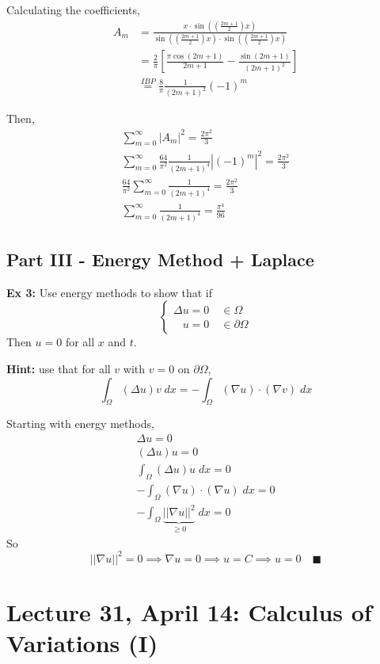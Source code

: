 \documentclass[12pt]{article}
\begin{document}
Calculating the coefficients, 
\begin{align*}
    A_m &= \frac{x \cdot \sin\left(\left(\frac{2m + 1}{2}\right)x\right)}{\sin\left(\left(\frac{2m + 1}{2}\right)x\right) \cdot \sin\left(\left(\frac{2m + 1}{2}\right)x\right)}\\
    &= \frac{2}{\pi}\left[\frac{\pi\cos(2m + 1)}{2m + 1} - \frac{\sin(2m + 1)}{(2m + 1)^2}\right]\\
    &\overset{IBP}{=} \frac{8}{\pi} \frac{1}{(2m + 1)^2}(-1)^m
\end{align*}

Then, 
\begin{gather*}
    \sum_{m=0}^\infty |A_m|^2 = \frac{2\pi^2}{3}\\
    \sum_{m=0}^\infty \frac{64}{\pi^2} \frac{1}{(2m+1)^4} |(-1)^m|^2 = \frac{2\pi^2}{3}\\
    \frac{64}{\pi^2} \sum_{m=0}^\infty \frac{1}{(2m+1)^4} = \frac{2\pi^2}{3}\\
    \boxed{\sum_{m=0}^\infty \frac{1}{(2m+1)^4} = \frac{\pi^4}{96}}
\end{gather*}

\subsection*{Part III - Energy Method + Laplace}
\textbf{Ex 3:} Use energy methods to show that if 
\[\begin{cases*}
    \Delta u = 0 \quad \in \Omega\\
    \; \; \; u = 0 \quad \in \partial \Omega
\end{cases*}\]
Then $u = 0$ for all $x$ and $t$. 

\textbf{Hint:} use that for all $v$ with $v = 0$ on $\partial \Omega$, 
\[\int_\Omega  (\Delta u)v\; dx = -\int_{\Omega} (\nabla u) \cdot (\nabla v)\; dx\]

Starting with energy methods, 
\begin{gather*}
    \Delta u = 0\\
    (\Delta u)u = 0\\
    \int_\Omega (\Delta u) u\; dx = 0\\
    -\int_\Omega (\nabla u) \cdot (\nabla u)\; dx = 0\\
    -\int_\Omega \underbrace{||\nabla u||^2}_{\geq 0}\; dx = 0
\end{gather*}
So 
\[||\nabla u||^2 = 0 \implies \nabla u = 0 \implies u = C \implies u = 0 \quad \blacksquare\]

\section*{Lecture 31, April 14: Calculus of Variations (I)}
\end{document}
